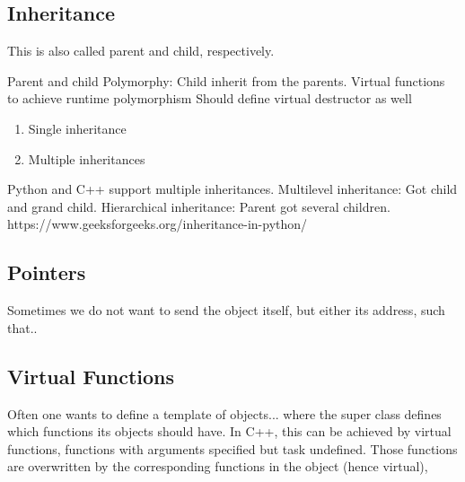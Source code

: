 \subsection{Inheritance}
This is also called parent and child, respectively. 

Parent and child
Polymorphy: Child inherit from the parents. 
Virtual functions to achieve runtime polymorphism 
Should define virtual destructor as well 

\begin{enumerate}
	\item Single inheritance
	\item Multiple inheritances
\end{enumerate}

Python and C++ support multiple inheritances. Multilevel inheritance: Got child and grand child. Hierarchical inheritance: Parent got several children. https://www.geeksforgeeks.org/inheritance-in-python/

\subsection{Pointers}
Sometimes we do not want to send the object itself, but either its address, such that..

\subsection{Virtual Functions}
Often one wants to define a template of objects... where the super class defines which functions its objects should have. In C++, this can be achieved by virtual functions, functions with arguments specified but task undefined. Those functions are overwritten by the corresponding functions in the object (hence virtual), 